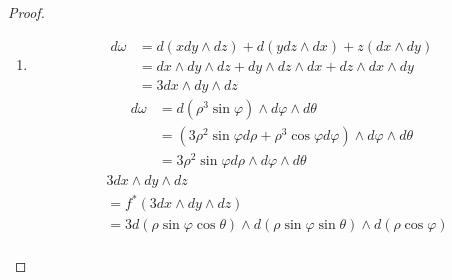 \documentclass[../main.tex]{subfiles}
\begin{document}
\begin{proof}
\begin{enumerate}
\[\begin{aligned}
\end{aligned}
\] \[
\begin{aligned}
&d\left( \rho \sin  \varphi \cos  \theta  \right)\wedge d\left( \rho \sin  \varphi \sin  \theta  \right)\\ 
 &= \rho ^{2}\sin  \varphi \cos  \varphi d \varphi \wedge d \theta  -\rho \sin ^{2}  \varphi d \theta \wedge d\rho 
\end{aligned}
\]全部带入, 得到 \[
\begin{aligned}
 \omega &= \left( -\rho ^{2}\sin  \varphi \sin  \theta \cos  \theta + \rho ^{2}\sin  \varphi \sin  \theta \cos  \theta  \right)d\rho \wedge d \varphi  \\ 
  &+ \left( \rho ^{3}\sin ^{3} \varphi  \cos ^{2} \theta  + \rho ^{3}\sin^{3} \varphi \sin ^{2} \theta  + \rho ^{3}\sin  \varphi \cos ^{2} \varphi  \right) \,\mathrm{d}  \varphi \wedge \,\mathrm{d}  \theta \\ 
   &+ \left( \rho ^{2}\sin ^{2} \varphi \cos  \varphi \cos ^{2} \theta + \rho ^{2}\sin ^{2} \varphi \cos  \varphi \sin ^{2} \theta -\rho^{2} \sin ^{2} \varphi \cos  \varphi  \right) \,\mathrm{d}  \theta \wedge \,\mathrm{d} \rho \\ 
    &=\rho ^{3}\sin  \varphi d \varphi \wedge d \theta 
\end{aligned} 
\]因此 \[
 \omega = \rho ^{3}\sin  \varphi d \varphi \wedge d \theta 
\]
\item \[
\begin{aligned}
d \omega& = d\left( xd y\wedge dz \right)+ d\left( y dz\wedge dx \right)+  z \left( dx\wedge dy \right)    \\ 
 &= dx\wedge dy\wedge dz+ dy\wedge dz\wedge dx+ dz\wedge dx\wedge dy\\ 
  &= 3dx\wedge dy\wedge dz
\end{aligned}
\] \[
\begin{aligned}
d \omega& = d\left( \rho ^{3}\sin  \varphi  \right)\wedge d \varphi \wedge d \theta   \\ 
 &= \left( 3\rho ^{2}\sin  \varphi d\rho + \rho ^{3}\cos  \varphi d \varphi  \right)\wedge d \varphi \wedge d  \theta \\ 
  &= 3\rho ^{2}\sin  \varphi d\rho \wedge d \varphi \wedge d \theta  
\end{aligned}
\] \[
\begin{aligned}
&3dx\wedge dy\wedge dz\\ 
 &= f ^{*}\left( 3dx\wedge dy\wedge dz \right) \\ 
 &=   3 d\left( \rho \sin  \varphi \cos  \theta  \right)\wedge d\left( \rho \sin  \varphi \sin  \theta  \right)\wedge d\left( \rho \cos  \varphi  \right)   \\ 

\end{aligned}\]
\end{enumerate}
\end{proof}
\end{document}
